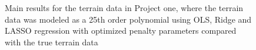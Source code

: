 \documentclass[reprint, english, nofootinbib]{revtex4-2}
\begin{document}
\begin{figure}[h!tb]
    \center
    \caption{Main results for the terrain data in Project one, where the terrain data was modeled as a 25th order polynomial using OLS, Ridge and LASSO regression with optimized penalty parameters compared with the true terrain data}
    \label{fig:3d_terrain PROJECT 1}
\end{figure}
\end{document}
